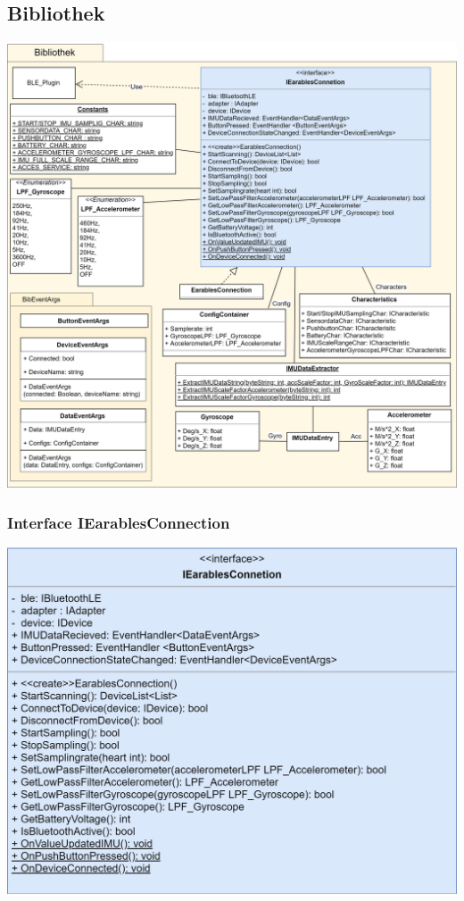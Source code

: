 \documentclass[a4paper,12pt]{article}
\begin{document}
\subsection{Bibliothek}
\begin{center}
	\includegraphics[width=\textwidth]{Diagramme/uebersicht/Bibliothek.png}
\end{center}	
\subsubsection{Interface IEarablesConnection}
	
	\includegraphics[width=\textwidth]{bilder/BibPackageKlassen/IEarablesConnection.png}
\end{document}
